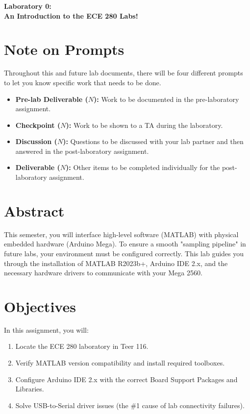 \documentclass[12pt]{article}
\begin{document}
\begin{center}
\huge{\bf Laboratory 0:}\\
\large{\bf An Introduction to the ECE 280 Labs!}
\end{center}

\tableofcontents

\section*{Note on Prompts}
Throughout this and future lab documents, there will be four different prompts to let you know specific work that needs to be done.
\begin{itemize}
\item \color{BrickRed}\textbf{Pre-lab Deliverable ($N$): }Work to be documented in the pre-laboratory assignment.\color{black} 
\item \color{OliveGreen}\textbf{Checkpoint ($N$): }Work to be shown to a TA during the laboratory.\color{black}
\item \color{Plum}\textbf{Discussion ($N$): }Questions to be discussed with your lab partner and then answered in the post-laboratory assignment.\color{black} 
\item \color{BlueViolet}\textbf{Deliverable ($N$): }Other items to be completed individually for the post-laboratory assignment.\color{black}
\end{itemize}
\clearpage

\section{Abstract}
This semester, you will interface high-level software (MATLAB) with physical embedded hardware (Arduino Mega). To ensure a smooth "sampling pipeline" in future labs, your environment must be configured correctly. This lab guides you through the installation of MATLAB R2023b+, Arduino IDE 2.x, and the necessary hardware drivers to communicate with your Mega 2560.

\section{Objectives}
In this assignment, you will:
\begin{enumerate}
    \item Locate the ECE 280 laboratory in Teer 116.
    \item Verify MATLAB version compatibility and install required toolboxes.
    \item Configure Arduino IDE 2.x with the correct Board Support Packages and Libraries.
    \item Solve USB-to-Serial driver issues (the \#1 cause of lab connectivity failures).
\end{enumerate}
\end{document}

